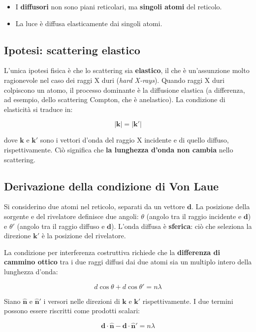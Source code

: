 \begin{itemize}
    \item I \textbf{diffusori} non sono piani reticolari, ma \textbf{singoli atomi} del reticolo.
    \item La luce è diffusa elasticamente dai singoli atomi.
\end{itemize}

\subsection*{Ipotesi: scattering elastico}

L'unica ipotesi fisica è che lo scattering sia \textbf{elastico}, il che è un'assunzione molto ragionevole nel caso dei raggi X duri (\textit{hard X-rays}). Quando raggi X duri colpiscono un atomo, il processo dominante è la diffusione elastica (a differenza, ad esempio, dello scattering Compton, che è anelastico). La condizione di elasticità si traduce in:

$$|\mathbf{k}| = |\mathbf{k}'|$$

dove $\mathbf{k}$ e $\mathbf{k}'$ sono i vettori d'onda del raggio X incidente e di quello diffuso, rispettivamente. Ciò significa che \textbf{la lunghezza d'onda non cambia} nello scattering.

\subsection*{Derivazione della condizione di Von Laue}

Si considerino due atomi nel reticolo, separati da un vettore $\mathbf{d}$. La posizione della sorgente e del rivelatore definisce due angoli: $\theta$ (angolo tra il raggio incidente e $\mathbf{d}$) e $\theta'$ (angolo tra il raggio diffuso e $\mathbf{d}$). L'onda diffusa è \textbf{sferica}: ciò che seleziona la direzione $\mathbf{k}'$ è la posizione del rivelatore.

La condizione per interferenza costruttiva richiede che la \textbf{differenza di cammino ottico} tra i due raggi diffusi dai due atomi sia un multiplo intero della lunghezza d'onda:

$$d\cos\theta + d\cos\theta' = n\lambda$$

Siano $\hat{\mathbf{n}}$ e $\hat{\mathbf{n}}'$ i versori nelle direzioni di $\mathbf{k}$ e $\mathbf{k}'$ rispettivamente. I due termini possono essere riscritti come prodotti scalari:

$$\mathbf{d} \cdot \hat{\mathbf{n}} - \mathbf{d} \cdot \hat{\mathbf{n}}' = n\lambda$$

